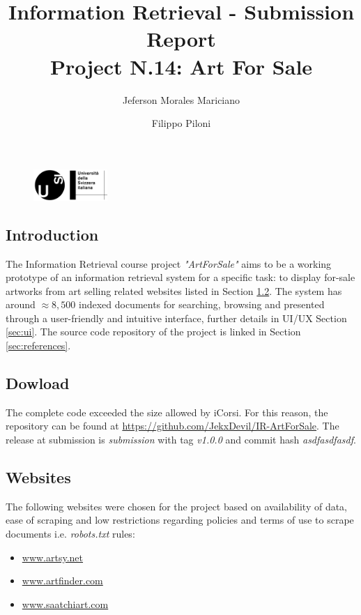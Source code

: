 \documentclass[12pt]{spieman}  %
\title{Information Retrieval - Submission Report \\Project N.14: Art For Sale}
\author{Jeferson Morales Mariciano}
\author{Filippo Piloni}
\affil{Università della Svizzera italiana, Faculty of Informatics, Lugano, Switzerland}
\begin{document}
\begin{figure}
    \includegraphics[width=0.25\textwidth, trim={0cm 0cm 0cm 7cm}]{USI_logo.png}
\end{figure}

\maketitle
\tableofcontents
\newpage

\begin{spacing}{1}   %

    \section{Introduction}
    The Information Retrieval course project \textit{"ArtForSale"} aims to be a working prototype of an
    information retrieval system for a specific task: to display for-sale artworks from art selling related
    websites listed in Section \ref{sec:websites}.
    The system has around $\approx 8,500$ indexed documents for searching, browsing and presented through a
    user-friendly and intuitive interface, further details in UI/UX Section \ref{sec:ui}.
    The source code repository of the project is linked in Section \ref{sec:references}.

    \subsection{Dowload}
    The complete code exceeded the size allowed by iCorsi.
    For this reason, the repository can be found at
    \url{https://github.com/JekxDevil/IR-ArtForSale}.
    The release at submission is \textit{submission} with tag \textit{v1.0.0} and commit hash
    \textit{asdfasdfasdf}.

    \subsection{Websites}\label{sec:websites}
    The following websites were chosen for the project based on availability of data, ease of scraping and
    low restrictions regarding policies and terms of use to scrape documents i.e. \textit{robots.txt} rules:

    \begin{itemize}
        \item \url{www.artsy.net}
        \item \url{www.artfinder.com}
        \item \url{www.saatchiart.com}
    \end{itemize}


\end{spacing}
\end{document}
